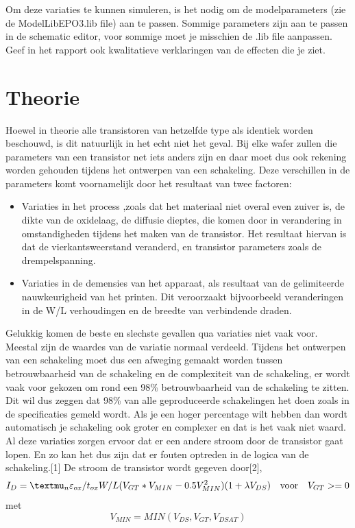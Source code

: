 \documentclass{article}
\begin{document}
Om deze variaties te kunnen simuleren, is het nodig om de modelparameters (zie de ModelLibEPO3.lib
ﬁle) aan te passen. Sommige parameters zijn aan te passen in de schematic editor, voor sommige moet je
misschien de .lib ﬁle aanpassen. Geef in het rapport ook kwalitatieve verklaringen van de effecten die je
ziet.

\section{Theorie}

Hoewel in theorie alle transistoren van hetzelfde type als identiek worden beschouwd, is dit natuurlijk in het echt niet het geval. 
Bij elke wafer zullen die parameters van een transistor net iets anders zijn en daar moet dus ook rekening worden gehouden tijdens het ontwerpen van een schakeling. Deze verschillen in de parameters komt voornamelijk door het resultaat van twee factoren:
\newline
\begin {itemize}
	\item Variaties in het process ,zoals dat het materiaal niet overal even zuiver is, de dikte van de oxidelaag, de diffusie dieptes, die komen door in verandering in omstandigheden tijdens het maken van de transistor. Het resultaat hiervan is dat de vierkantsweerstand veranderd, en transistor parameters zoals de drempelspanning.
	\item Variaties in de demensies van het apparaat, als resultaat van de gelimiteerde nauwkeurigheid van het printen. Dit veroorzaakt bijvoorbeeld veranderingen in de W/L verhoudingen en de breedte van verbindende draden.
\end {itemize}

Gelukkig komen de beste en slechste gevallen qua variaties niet vaak voor. Meestal zijn de waardes van de variatie normaal verdeeld. 
Tijdens het ontwerpen van een schakeling moet dus een afweging gemaakt worden tussen betrouwbaarheid van de schakeling en de complexiteit van de schakeling, er wordt vaak voor gekozen om rond een 98\% betrouwbaarheid van de schakeling te zitten. Dit wil dus zeggen dat 98\% van alle geproduceerde schakelingen het doen zoals in de specificaties gemeld wordt. Als je een hoger percentage wilt hebben dan wordt automatisch je schakeling ook groter en complexer en dat is het vaak niet waard.\\
Al deze variaties zorgen ervoor dat er een andere stroom door de transistor gaat lopen. En zo kan het dus zijn dat er fouten optreden in de logica van de schakeling.[1] De stroom de transistor wordt gegeven door[2],
\newline
\begin {equation}
	I_D = \textmu _{n}\varepsilon _{ox}/t_{ox}W/L(V_{GT}*V_{MIN} - 0.5V_{MIN}^2)(1+\lambda V_{DS})    \mathrm{~~~voor~~~}    V_{GT}>= 0
\end {equation}
 met 
\begin {equation}
	V_{MIN} = MIN(V_{DS},V_{GT},V_{DSAT})
\end {equation}
\end{document}
